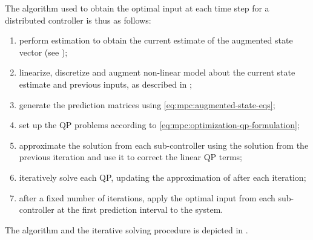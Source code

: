 The algorithm used to obtain the optimal input at each time step for a distributed controller is thus as follows:

\begin{enumerate}
  \item perform estimation to obtain the current estimate of the augmented state vector (see );
  \item linearize, discretize and augment non-linear model about the current state estimate and previous inputs, as described in ;
  \item generate the prediction matrices using \eqref{eq:mpc:augmented-state-eqs};
  \item set up the QP problems according to \eqref{eq:mpc:optimization-qp-formulation};
  \item approximate the solution from each sub-controller using the solution from the previous iteration and use it to correct the linear QP terms;
  \item iteratively solve each QP, updating the approximation of   after each iteration;
  \item after a fixed number of iterations, apply the optimal input from each sub-controller at the first prediction interval to the system.
\end{enumerate}

The algorithm and the iterative solving procedure is depicted in .


